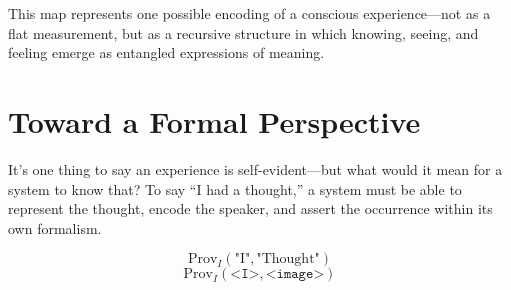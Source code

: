 \documentclass[runningheads]{llncs}
\begin{document}
This map represents one possible encoding of a conscious experience—not as a flat measurement, but as a recursive structure in which knowing, seeing, and feeling emerge as entangled expressions of meaning.

\section{Toward a Formal Perspective}

It’s one thing to say an experience is self-evident—but what would it mean for a system to know that? To say “I had a thought,” a system must be able to represent the thought, encode the speaker, and assert the occurrence within its own formalism.

\begin{equation}
\text{Prov}_I(\text{"I"}, \text{"Thought"})
\end{equation}
\begin{equation}
\text{Prov}_I(\texttt{<I>}, \texttt{<image>})
\end{equation}
\end{document}
